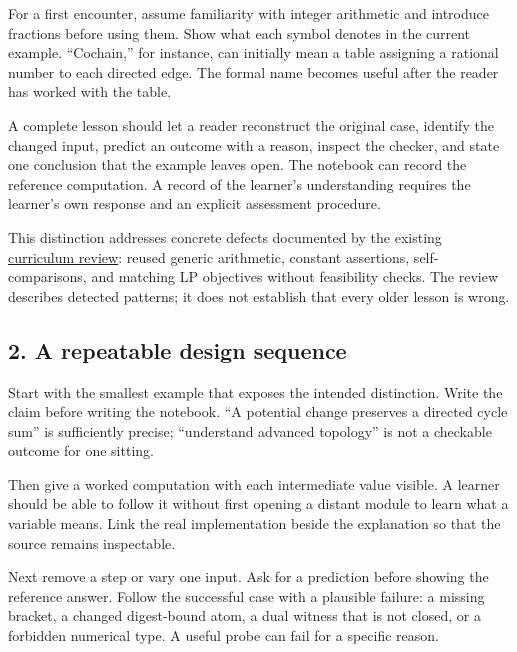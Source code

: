 \documentclass[
  11pt,
]{article}
\begin{document}
For a first encounter, assume familiarity with integer arithmetic and
introduce fractions before using them. Show what each symbol denotes in
the current example. ``Cochain,'' for instance, can initially mean a
table assigning a rational number to each directed edge. The formal name
becomes useful after the reader has worked with the table.

A complete lesson should let a reader reconstruct the original case,
identify the changed input, predict an outcome with a reason, inspect
the checker, and state one conclusion that the example leaves open. The
notebook can record the reference computation. A record of the learner's
understanding requires the learner's own response and an explicit
assessment procedure.

This distinction addresses concrete defects documented by the existing
\href{https://github.com/dbccpage/the_symbol_game/blob/52cb5457f6c485ba548cfd292f6012a941ed22cf/omega_engine_education/the_symbol_game/lessons/system_integration/curriculum_125_review.md}{curriculum
review}: reused generic arithmetic, constant assertions,
self-comparisons, and matching LP objectives without feasibility checks.
The review describes detected patterns; it does not establish that every
older lesson is wrong.

\hypertarget{a-repeatable-design-sequence}{%
\subsection{2. A repeatable design
sequence}\label{a-repeatable-design-sequence}}

Start with the smallest example that exposes the intended distinction.
Write the claim before writing the notebook. ``A potential change
preserves a directed cycle sum'' is sufficiently precise; ``understand
advanced topology'' is not a checkable outcome for one sitting.

Then give a worked computation with each intermediate value visible. A
learner should be able to follow it without first opening a distant
module to learn what a variable means. Link the real implementation
beside the explanation so that the source remains inspectable.

Next remove a step or vary one input. Ask for a prediction before
showing the reference answer. Follow the successful case with a
plausible failure: a missing bracket, a changed digest-bound atom, a
dual witness that is not closed, or a forbidden numerical type. A useful
probe can fail for a specific reason.
\end{document}
